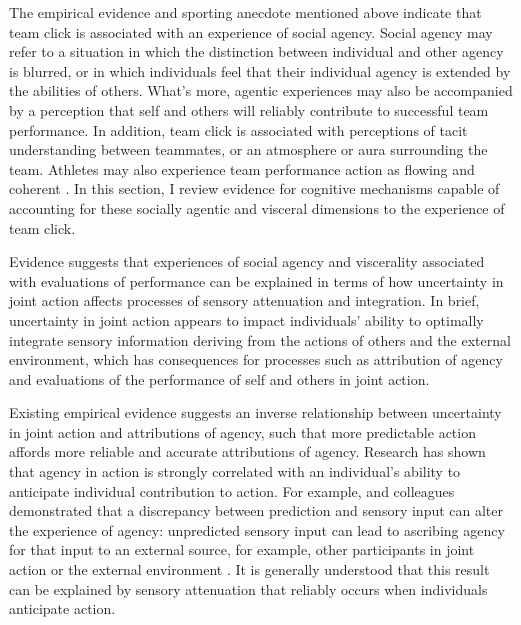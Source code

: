 \begin{CJK}{UTF8}{gbsn}
The empirical evidence and sporting anecdote mentioned above indicate that team click is associated with an experience of social agency. Social agency may refer to a situation in which the distinction between individual and other agency is blurred, or in which individuals feel that their individual agency is extended by the abilities of others.  What's more, agentic experiences may also be accompanied by a perception that self and others will reliably contribute to successful team performance.  In addition, team click is associated with perceptions of tacit understanding between teammates, or an atmosphere or aura surrounding the team.  Athletes may also experience team performance action as flowing and coherent \citep{Jackson1998b}.  In this section, I review evidence for cognitive mechanisms capable of accounting for these socially agentic and visceral dimensions to the experience of team click.

Evidence suggests that experiences of social agency and viscerality associated with evaluations of performance can be explained in terms of how uncertainty in joint action affects processes of sensory attenuation and integration.  In brief, uncertainty in joint action appears to impact individuals' ability to optimally integrate sensory information deriving from the actions of others and the external environment, which has consequences for processes such as attribution of agency and evaluations of the performance of self and others in joint action.

Existing empirical evidence suggests an inverse relationship between uncertainty in joint action and attributions of agency, such that more predictable action affords more reliable and accurate attributions of agency.  Research has shown that agency in action is strongly correlated with an individual's ability to anticipate individual contribution to action.  For example, \textcite{Sato2008} and colleagues demonstrated that a discrepancy between prediction and sensory input can alter the experience of agency: unpredicted sensory input can lead to ascribing agency for that input to an external source, for example, other participants in joint action or the external environment \citep{Sato2005,Frith2007}.  It is generally understood that this result can be explained by sensory attenuation that reliably occurs when individuals anticipate action.


\end{CJK}
